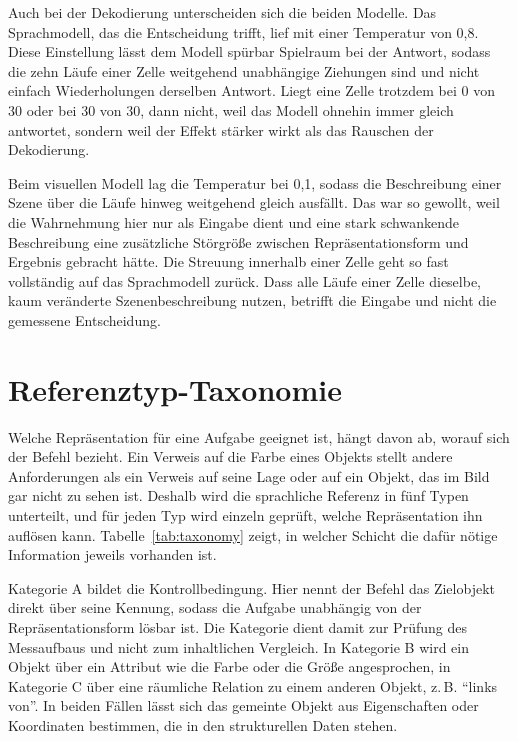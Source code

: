 Auch bei der Dekodierung unterscheiden sich die beiden Modelle.
Das Sprachmodell, das die Entscheidung trifft, lief mit einer Temperatur von 0{,}8.
Diese Einstellung lässt dem Modell spürbar Spielraum bei der Antwort, sodass die zehn Läufe einer Zelle weitgehend unabhängige Ziehungen sind und nicht einfach Wiederholungen derselben Antwort.
Liegt eine Zelle trotzdem bei 0 von 30 oder bei 30 von 30, dann nicht, weil das Modell ohnehin immer gleich antwortet, sondern weil der Effekt stärker wirkt als das Rauschen der Dekodierung.

Beim visuellen Modell lag die Temperatur bei 0{,}1, sodass die Beschreibung einer Szene über die Läufe hinweg weitgehend gleich ausfällt.
Das war so gewollt, weil die Wahrnehmung hier nur als Eingabe dient und eine stark schwankende Beschreibung eine zusätzliche Störgröße zwischen Repräsentationsform und Ergebnis gebracht hätte.
Die Streuung innerhalb einer Zelle geht so fast vollständig auf das Sprachmodell zurück.
Dass alle Läufe einer Zelle dieselbe, kaum veränderte Szenenbeschreibung nutzen, betrifft die Eingabe und nicht die gemessene Entscheidung.


\section{Referenztyp-Taxonomie}
\label{sec:eval-taxonomy}

Welche Repräsentation für eine Aufgabe geeignet ist, hängt davon ab, worauf sich der Befehl bezieht.
Ein Verweis auf die Farbe eines Objekts stellt andere Anforderungen als ein Verweis auf seine Lage oder auf ein Objekt, das im Bild gar nicht zu sehen ist.
Deshalb wird die sprachliche Referenz in fünf Typen unterteilt, und für jeden Typ wird einzeln geprüft, welche Repräsentation ihn auflösen kann.
Tabelle~\ref{tab:taxonomy} zeigt, in welcher Schicht die dafür nötige Information jeweils vorhanden ist.

Kategorie A bildet die Kontrollbedingung.
Hier nennt der Befehl das Zielobjekt direkt über seine Kennung, sodass die Aufgabe unabhängig von der Repräsentationsform lösbar ist.
Die Kategorie dient damit zur Prüfung des Messaufbaus und nicht zum inhaltlichen Vergleich.
In Kategorie B wird ein Objekt über ein Attribut wie die Farbe oder die Größe angesprochen, in Kategorie C über eine räumliche Relation zu einem anderen Objekt, z.\,B. \enquote{links von}.
In beiden Fällen lässt sich das gemeinte Objekt aus Eigenschaften oder Koordinaten bestimmen, die in den strukturellen Daten stehen.

